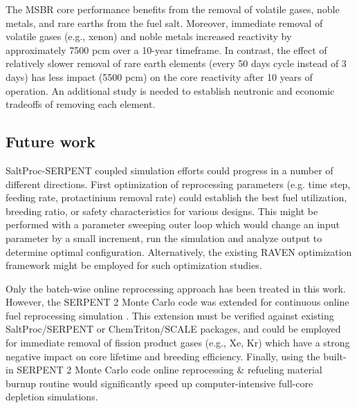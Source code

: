 The \gls{MSBR} core performance benefits from the removal of volatile gases, 
noble metals, and rare earths from the fuel salt. 
Moreover, immediate removal of volatile gases (e.g., xenon) and noble metals 
increased reactivity by approximately 7500 pcm over a 10-year 
timeframe. In contrast, the effect of relatively slower removal of rare earth 
elements (every 50 days cycle instead of 3 days) has less impact (5500 pcm) on 
the core reactivity after 10 years of operation. An additional study 
is needed to establish neutronic  and economic tradeoffs of removing each element.

\subsection{Future work}
SaltProc-SERPENT coupled simulation efforts could progress in a 
number of different directions. First optimization of reprocessing parameters (e.g. time step, feeding rate, 
protactinium removal rate) could establish the best fuel utilization, breeding 
ratio, or safety characteristics for various designs. This might be performed with a parameter sweeping 
outer loop which would change an input parameter by a small increment, run the 
simulation and analyze output to determine optimal configuration. Alternatively, 
the existing RAVEN optimization framework \cite{alfonsi_raven_2013} might be 
employed for such optimization studies.

Only the batch-wise online reprocessing approach has been treated in this 
work. However, the SERPENT 2 Monte Carlo code was extended for 
continuous online fuel reprocessing simulation \cite{aufiero_extended_2013}. 
This extension must be verified against existing SaltProc/SERPENT or 
ChemTriton/SCALE packages, and could be employed for immediate removal of 
fission product gases (e.g., Xe, Kr) which have a strong negative impact on 
core lifetime and breeding efficiency. Finally, using the built-in SERPENT 2 
Monte Carlo code online reprocessing \& refueling material burnup routine would 
significantly speed up computer-intensive full-core depletion simulations.
